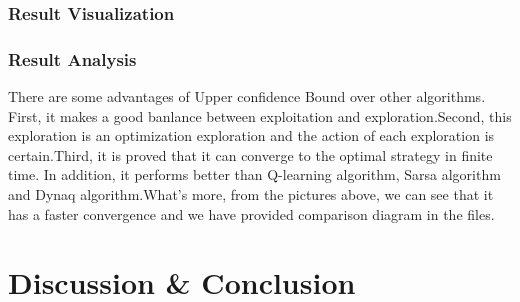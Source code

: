 \documentclass[aps,letterpaper,10pt]{revtex4}
\begin{document}
\subsubsection{Result Visualization}
		\begin{figure}[H]
	  \centering
	   
	  \label{fig:oscil}
	\end{figure}
		\begin{figure}[H]
	  \centering
	   
	  \label{fig:oscil}
	\end{figure}
\subsubsection{Result Analysis}
There are some advantages of Upper confidence Bound over other algorithms. First, it makes a good banlance between exploitation and exploration.Second, this exploration is an optimization exploration and the action of each exploration is certain.Third, it is proved that it can converge to the optimal strategy in finite time. In addition, it performs better than Q-learning algorithm, Sarsa algorithm and Dynaq algorithm.What's more, from the pictures above, we can see that it has a faster convergence and we have provided comparison diagram in the files.
\section{Discussion \& Conclusion}
\end{document}
